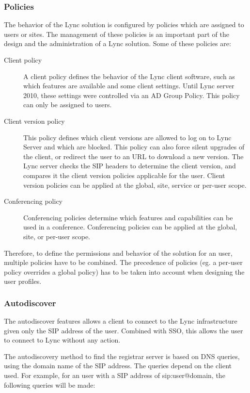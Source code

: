 \subsubsection{Policies}

The behavior of the Lync solution is configured by policies which are assigned to users or sites. The management of these policies is an important part of the design and the administration of a Lync solution. Some of these policies are:

\begin{description}
\item[Client policy] A client policy defines the behavior of the Lync client software, such as which features are available and some client settings. Until Lync server 2010, these settings were controlled via an AD Group Policy. This policy can only be assigned to users.

\item[Client version policy] This policy defines which client versions are allowed to log on to Lync Server and which are blocked. This policy can also force silent upgrades of the client, or redirect the user to an URL to download a new version. The Lync server checks the SIP headers to determine the client version, and compares it the client version policies applicable for the user. Client version policies can be applied at the global, site, service or per-user scope.

\item[Conferencing policy] Conferencing policies determine which features and capabilities can be used in a conference. Conferencing policies can be applied at the global, site, or per-user scope.
\end{description}

Therefore, to define the permissions and behavior of the solution for an user, multiple policies have to be combined. The precedence of policies (eg. a per-user policy overrides a global policy) has to be taken into account when designing the user profiles.


\subsubsection{Autodiscover}
The autodiscover features allows a client to connect to the Lync infrastructure given only the SIP address of the user. Combined with SSO, this allows the user to connect to Lync without any action.

The autodiscovery method to find the registrar server is based on DNS queries, using the domain name of the SIP address. The queries depend on the client used. For example, for an user with a SIP address of sip:user@domain, the following queries will be made:

